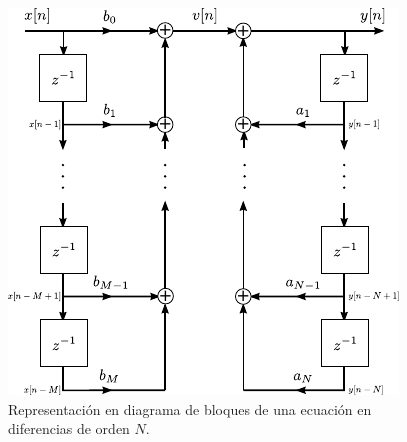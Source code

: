 \documentclass[a4paper]{report}
\begin{document}
\begin{figure}[!htb]
  \begin{minipage}[c]{0.56\textwidth}
    \includegraphics[width=\textwidth]{figuras/structures_general_difference_equation_direct_form_I.pdf}
  \end{minipage}\hfill
  \begin{minipage}[c]{0.34\textwidth}
    \caption{
     Representación en diagrama de bloques de una ecuación en diferencias de orden \(N\).
    }\label{fig:structures_general_difference_equation_direct_form_I}
  \end{minipage}
\end{figure}
 
\end{document}
